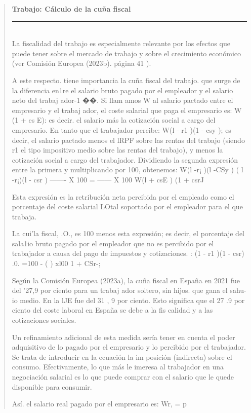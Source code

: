 \documentclass[10pt,a4paper]{article}
\newenvironment{specialblock}[1]{%
      \begin{quote} %
      \small %
      \noindent\textbf{#1}\\[-0.3em] %
      \rule{\linewidth}{0.4pt}\\[0.6em]}{
      \end{quote}}
\begin{document}
\begin{specialblock}{\textbf{Trabajo:} Cálculo de la cuña fiscal}
    La fiscalidad del trabajo es especialmente relevante por los efectos que puede tener sobre el mercado de trabajo y sobre el crecimiento económico (ver Comisión Europea (2023b). página 41 ).
    
    A este respecto. tiene importancia la cuña fiscal del trabajo. que surge de la diferencia en1re el salario bruto pagado por el empleador y el salario neto del trabaj ador-1 ��. Si llam amos W al salario pactado entre el empresario y el trabaj ador, el coste salarial que paga el empresario es: W (1 + es E): es decir. el salario más la cotización social a cargo del empresario. En tanto que el trabajador percibe: W(l - r1 )(1 - csy ); es decir, el salario pactado menos el lRPF sobre las rentas del trabajo (siendo r1 el tipo impositivo medio sobre las rentas del trabajo), y menos la cotización social a cargo del trabajador. Dividiendo la segunda expresión entre la primera y multiplicando por 100, obtenemos: W(l -r¡ )(l -CSy ) ( l -r¡)(l - csr ) ------- X 100 = ------ X 100 W(l + csE ) (1 + csrJ
    
    Esta expresión es la retribución neta percibida por el empleado como el porcentaje del coste salarial LOtal soportado por el empleador para el que trabaja.

    La cui'la fiscal, .O., es 100 menos esta expresión; es decir, el porcentaje del sala1io bruto pagado por el empleador que no es percibido por el trabajador a causa del pago de impuestos y cotizaciones. : (1 - r1 )(1 - csr) .0. =100 - ( ) xl00 1 + CSr-;
    
    Según la Comisión Europea (2023a), la cuña fiscal en España en 2021 fue del '27,9 por ciento para un trabaj ador soltero, sin hijos. que gana el sahu-io medio. En la lJE fue del 31 , 9 por ciento. Esto significa que el 27 .9 por ciento del coste laboral en España se debe a la fis calidad y a las cotizaciones sociales.
    
    Un refinamiento adicional de esta medida sería tener en cuenta el poder adquisitivo de lo pagado por el empresario y lo percibido por el trabajador. Se trata de introducir en la ecuación la im posición (indirecta) sobre el consumo. Efectivamente, lo que más le imeresa al trabajador en una negociación salarial es lo que puede comprar con el salario que le quede disponible para consumir. 

    Así. el salario real pagado por el empresario es:    Wr, = p
    

\end{specialblock}
\end{document}
